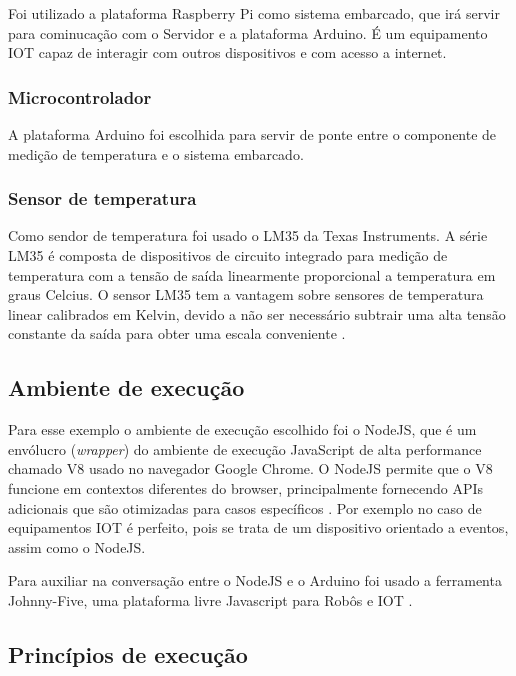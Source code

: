 Foi utilizado a plataforma Raspberry Pi como sistema embarcado, que irá
servir para cominucação com o Servidor e a plataforma Arduino. É um
equipamento IOT capaz de interagir com outros dispositivos e com acesso
a internet.

\subsubsection{Microcontrolador}\label{microcontrolador}

A plataforma Arduino foi escolhida para servir de ponte entre o
componente de medição de temperatura e o sistema embarcado.

\subsubsection{Sensor de temperatura}\label{sensor-de-temperatura}

Como sendor de temperatura foi usado o LM35 da Texas Instruments. A
série LM35 é composta de dispositivos de circuito integrado para medição
de temperatura com a tensão de saída linearmente proporcional a
temperatura em graus Celcius. O sensor LM35 tem a vantagem sobre
sensores de temperatura linear calibrados em Kelvin, devido a não ser
necessário subtrair uma alta tensão constante da saída para obter uma
escala conveniente \cite{lm35:2016}.

\subsection{Ambiente de execução}\label{ambiente-de-execuuxe7uxe3o}

Para esse exemplo o ambiente de execução escolhido foi o NodeJS, que é
um envólucro (\emph{wrapper}) do ambiente de execução JavaScript de alta
performance chamado V8 usado no navegador Google Chrome. O NodeJS
permite que o V8 funcione em contextos diferentes do browser,
principalmente fornecendo APIs adicionais que são otimizadas para casos
específicos \cite{hughes-croucher:2012}. Por exemplo no caso de
equipamentos IOT é perfeito, pois se trata de um dispositivo orientado a
eventos, assim como o NodeJS.

Para auxiliar na conversação entre o NodeJS e o Arduino foi usado a
ferramenta Johnny-Five, uma plataforma livre Javascript para Robôs e IOT
\cite{johnny-five:2012}.

\subsection{Princípios de
execução}\label{princuxedpios-de-execuuxe7uxe3o}

